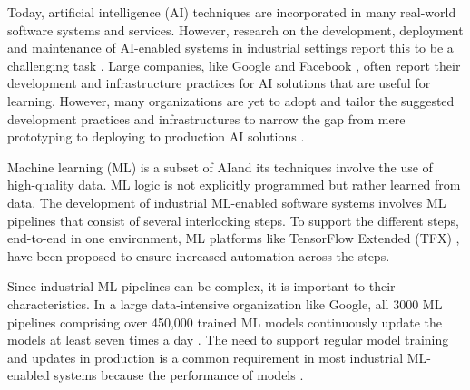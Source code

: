 Today, artificial intelligence (AI) techniques are incorporated in many real-world software systems and services. However, research on the development, deployment and maintenance of AI-enabled systems in industrial settings report this to be a challenging task \cite{Sculley2015, Lwakatare2019}. Large companies, like Google \cite{Baylor2017} and Facebook \cite{Hazelwood2018Facebook}, often report their development and infrastructure practices for AI solutions that are useful for learning. However, many organizations are yet to adopt and tailor the suggested development practices and infrastructures to narrow the gap from mere prototyping to deploying to production AI solutions \cite{Serban2020Practices}. 

Machine learning (ML) is a subset of AI\DIFaddbegin \DIFadd{, }\DIFaddend and its techniques involve the use of high-quality data. \DIFdelbegin {}\DIFdelend ML logic is not explicitly programmed but \DIFdelbegin {}\DIFdelend rather learned from data. The development of industrial ML-enabled software systems involves ML pipelines that consist of several interlocking steps. To support the different steps, end-to-end in one environment, ML platforms like TensorFlow Extended (TFX) \cite{Baylor2017}, have been proposed to ensure increased automation across the steps.

Since industrial ML pipelines can be complex, it is important to \DIFdelbegin {}\DIFdelend \DIFaddbegin {}\DIFaddend their characteristics. In a large data-intensive organization \DIFdelbegin \DIFdel{, }\DIFdelend like Google, all 3000 ML pipelines comprising \DIFdelbegin {}\DIFdelend over 450,000 trained ML models continuously update the models at least seven times a day \cite{Doris2021MLPipelines}. %
The need to support regular model training and updates in production is a common requirement in most industrial ML-enabled systems because
\DIFdelbegin {}\DIFdelend %
the performance of models \DIFdelbegin {}\DIFdelend \DIFaddbegin {}\DIFaddend \cite{Sculley2015}.

